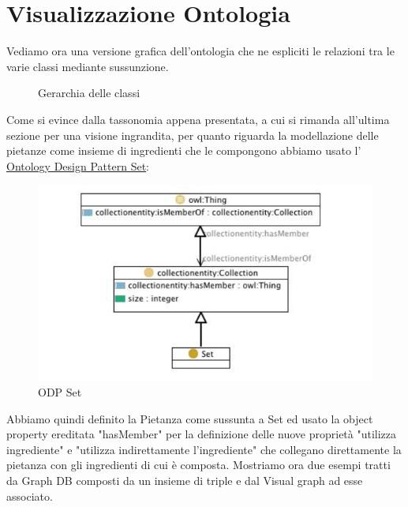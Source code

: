 \documentclass[12pt]{article}
\begin{document}

\section{Visualizzazione Ontologia}
    Vediamo ora una versione grafica dell'ontologia che ne espliciti le relazioni tra le varie classi mediante sussunzione.
    \begin{figure}[H]
        \caption{Gerarchia delle classi}
    \end{figure}
    Come si evince dalla tassonomia appena presentata, a cui si rimanda all'ultima sezione per una visione ingrandita, per quanto riguarda la modellazione delle pietanze come insieme di ingredienti che le compongono abbiamo usato l' \href{http://ontologydesignpatterns.org/wiki/Submissions:Set}{Ontology Design Pattern Set}:
    \begin{figure}[H]
        \centering
          \includegraphics[width=12cm]{files/ODPSet.png}
        \caption{ODP Set}
    \end{figure}
    Abbiamo quindi definito la Pietanza come sussunta a Set ed usato la object property ereditata "hasMember" per la definizione delle nuove proprietà "utilizza ingrediente" e "utilizza indirettamente l'ingrediente" che collegano direttamente la pietanza con gli ingredienti di cui è composta.
    \newline
    Mostriamo ora due esempi tratti da Graph DB composti da un insieme di triple e dal Visual graph ad esse associato.
\end{document}
